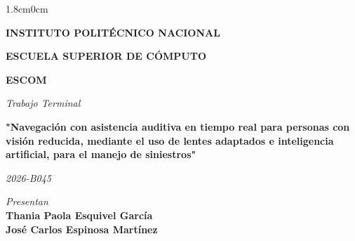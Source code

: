 \begin{adjustwidth}{1.8cm}{0cm} 


    
    {\fontsize{20pt}{14pt}\selectfont
    \begin{center}
    \textbf{INSTITUTO POLITÉCNICO NACIONAL}
    \end{center}
    }
    
    \vspace{-0.5cm} %
    
    {\fontsize{16pt}{14pt}\selectfont
    \begin{center}
    \textbf{ESCUELA SUPERIOR DE CÓMPUTO}
    \end{center}
    }
    
    \vspace{0.5cm} %
    
    
    {\fontsize{16pt}{14pt}\selectfont
    \begin{center}
    \textbf{ESCOM}
    \end{center}
    }
    
    \vspace{0cm} %
    
    {\fontsize{14pt}{14pt}\selectfont
    \begin{center}
    \textit{Trabajo Terminal}
    \end{center}
    }
    
    \vspace{0cm} %
    
    {\fontsize{16pt}{14pt}\selectfont
    \begin{center}
        \textbf{"Navegación con asistencia auditiva en tiempo real para personas con visión reducida, mediante el uso de lentes adaptados e inteligencia artificial, para el manejo de siniestros"}
    \end{center}
    }
    
    \vspace{-1cm} %
    
    {\fontsize{14pt}{14pt}\selectfont
    \begin{center}
    \textit{2026-B045}
    \end{center}
    }
    
    \vspace{0.3cm} %
    
    {\fontsize{14pt}{14pt}\selectfont
    \begin{center}
    \textit{Presentan}\\
    \bf{Thania Paola Esquivel García}\\
    \bf{José Carlos Espinosa Martínez}
    \end{center}
    }


\end{adjustwidth}
